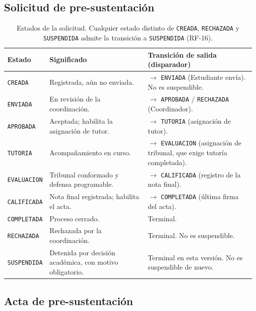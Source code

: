 \documentclass[11pt,a4paper]{article}
\begin{document}
\subsection{Solicitud de pre-sustentación}

\begin{table}[H]\centering\small
\begin{tabular}{p{2.4cm} p{4.6cm} p{7.4cm}}
\toprule
\textbf{Estado} & \textbf{Significado} & \textbf{Transición de salida (disparador)} \\
\midrule
\texttt{CREADA} & Registrada, aún no enviada. & $\rightarrow$ \texttt{ENVIADA} (Estudiante
envía). No es suspendible. \\
\texttt{ENVIADA} & En revisión de la coordinación. & $\rightarrow$ \texttt{APROBADA} /
\texttt{RECHAZADA} (Coordinador). \\
\texttt{APROBADA} & Aceptada; habilita la asignación de tutor. & $\rightarrow$ \texttt{TUTORIA}
(asignación de tutor). \\
\texttt{TUTORIA} & Acompañamiento en curso. & $\rightarrow$ \texttt{EVALUACION} (asignación de
tribunal, que exige tutoría completada). \\
\texttt{EVALUACION} & Tribunal conformado y defensa programable. & $\rightarrow$
\texttt{CALIFICADA} (registro de la nota final). \\
\texttt{CALIFICADA} & Nota final registrada; habilita el acta. & $\rightarrow$
\texttt{COMPLETADA} (última firma del acta). \\
\texttt{COMPLETADA} & Proceso cerrado. & Terminal. \\
\texttt{RECHAZADA} & Rechazada por la coordinación. & Terminal. No es suspendible. \\
\texttt{SUSPENDIDA} & Detenida por decisión académica, con motivo obligatorio. & Terminal en
esta versión. No es suspendible de nuevo. \\
\bottomrule
\end{tabular}
\caption{Estados de la solicitud. Cualquier estado distinto de \texttt{CREADA},
\texttt{RECHAZADA} y \texttt{SUSPENDIDA} admite la transición a \texttt{SUSPENDIDA} (RF-16).}
\end{table}

\subsection{Acta de pre-sustentación}
\end{document}
